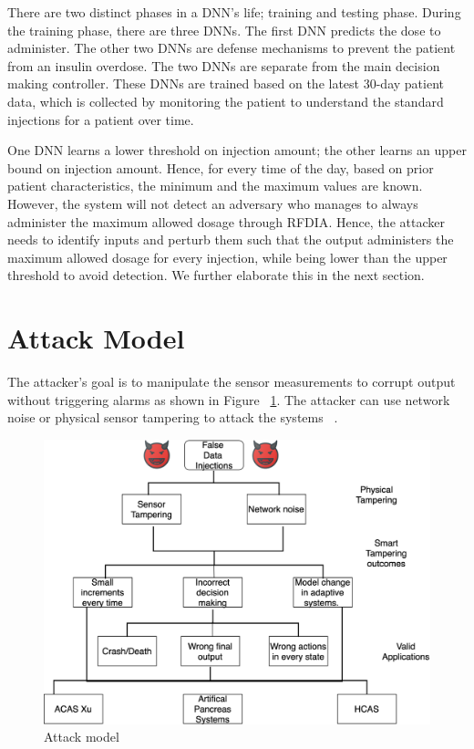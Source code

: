 There are two distinct phases in a \ac{DNN}'s life; training and testing phase. 
During the training phase, there are three \ac{DNN}s. 
The first \ac{DNN} predicts the dose to administer. 
The other two \ac{DNN}s are defense mechanisms to prevent the patient from an insulin overdose.  
The two \ac{DNN}s are separate from the main decision making controller. 
These \ac{DNN}s are trained based on the latest 30-day patient data, which is collected by monitoring the patient to understand the standard injections for a patient over time. 

One \ac{DNN} learns a lower threshold on injection amount; the other learns an upper bound on injection amount. 
Hence, for every time of the day, based on prior patient characteristics, the minimum and the maximum values are known. 
However, the system will not detect  an adversary  who manages to always administer the maximum allowed dosage through \ac{RFDIA}. 
Hence, the attacker needs to identify inputs and  perturb them  such that the output administers the maximum allowed dosage for every injection,
  while being lower than the upper threshold to avoid detection. 
  We further elaborate this in the next section. 


\section{Attack Model}
The attacker's goal is to manipulate the sensor measurements to corrupt output without triggering alarms as shown in Figure ~\ref{fig:attackmodelphysical}. 
The attacker can use network noise or physical sensor tampering to attack the systems ~\cite{10.1145/3319535.3339815}.
 
\begin{figure}
	\centering
	\includegraphics[width=0.7\linewidth]{Images/Attackmodelphysical}
	\caption{Attack model}
	\label{fig:attackmodelphysical}
\end{figure}

